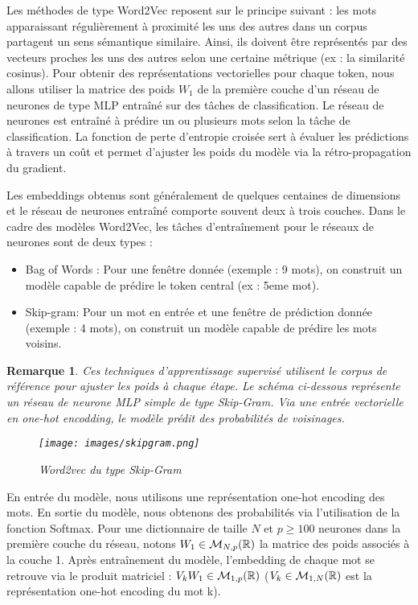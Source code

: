\documentclass[12pt]{article}
\newtheorem{rmq}{Remarque}
\theoremstyle{definition}
\begin{document}
	Les méthodes de type Word2Vec \cite{word2vec} reposent sur le principe suivant : les mots apparaissant régulièrement à proximité les uns des autres dans un corpus partagent un sens sémantique similaire. Ainsi, ils doivent être représentés par des vecteurs proches les uns des autres selon une certaine métrique (ex : la similarité cosinus). Pour obtenir des représentations vectorielles pour chaque token, nous allons utiliser la matrice des poids $W_1$ de la première couche d'un réseau de neurones de type MLP entraîné sur des tâches de classification. Le réseau de neurones est entraîné à prédire un ou plusieurs mots selon la tâche de classification. La fonction de perte d'entropie croisée sert à évaluer les prédictions à travers un coût et permet d'ajuster les poids du modèle via la rétro-propagation du gradient.
	
	Les embeddings obtenus sont généralement de quelques centaines de dimensions et le réseau de neurones entraîné comporte souvent deux à trois couches. Dans le cadre des modèles Word2Vec, les tâches d'entraînement pour le réseaux de neurones sont de deux types :
	\begin{itemize}
		\item Bag of Words : Pour une fenêtre donnée (exemple : 9 mots), on construit un modèle  capable de prédire le token central (ex : 5eme mot). 
		\item Skip-gram: Pour un mot en entrée et une fenêtre de prédiction donnée (exemple : 4 mots), on construit un modèle capable de prédire les mots voisins.
	\end{itemize}

	\begin{rmq}
			Ces techniques d'apprentissage supervisé utilisent le corpus de référence pour ajuster les poids à chaque étape. Le schéma ci-dessous représente un réseau de neurone MLP simple de type Skip-Gram. Via une entrée vectorielle en one-hot encodding, le modèle prédit des probabilités de voisinages. \\
			
		
		\begin{figure*}[!h]
			\centering
			\texttt{[image: images/skipgram.png]}
			\caption{Word2vec du type Skip-Gram }
		\end{figure*}
	\end{rmq}
	

	
	
	En entrée du modèle, nous utilisons une représentation one-hot encoding des mots. En sortie du modèle, nous obtenons des probabilités via l'utilisation de la fonction Softmax. Pour une dictionnaire de taille $N$ et $p\geq 100$ neurones dans la première couche du réseau, notons $W_1 \in \mathcal{M}_{N,p}(\mathbb{R})$ la matrice des poids associés à la couche 1. Après entraînement du modèle, l'embedding de chaque mot se retrouve via le produit matriciel : $V_kW_1 \in \mathcal{M}_{1,p}(\mathbb{R})$ ($V_k\in\mathcal{M}_{1,N}(\mathbb{R})$ est la représentation one-hot encoding du mot k).  
	
\end{document}

